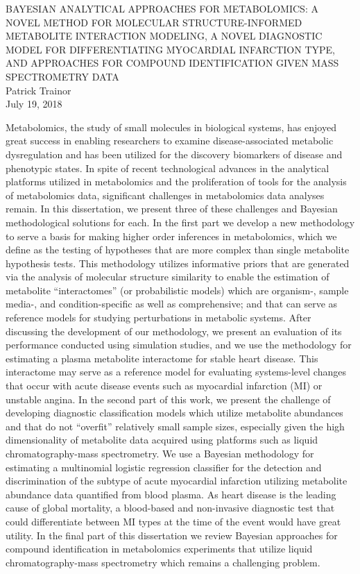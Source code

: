 \documentclass[final]{ulthesis}
\begin{document}
\begin{dissertationabstract}
\begin{center}
	BAYESIAN ANALYTICAL APPROACHES FOR METABOLOMICS: A NOVEL METHOD FOR MOLECULAR STRUCTURE-INFORMED METABOLITE INTERACTION MODELING, A NOVEL DIAGNOSTIC MODEL FOR DIFFERENTIATING MYOCARDIAL INFARCTION TYPE, AND APPROACHES FOR COMPOUND IDENTIFICATION GIVEN MASS SPECTROMETRY DATA \\
	Patrick Trainor \\
	July 19, 2018
\end{center}
Metabolomics, the study of small molecules in biological systems, has enjoyed great success in enabling researchers to examine disease-associated metabolic dysregulation and has been utilized for the discovery biomarkers of disease and phenotypic states. In spite of recent technological advances in the analytical platforms utilized in metabolomics and the proliferation of tools for the analysis of metabolomics data, significant challenges in metabolomics data analyses remain. In this dissertation, we present three of these challenges and Bayesian methodological solutions for each. In the first part we develop a new methodology to serve a basis for making higher order inferences in metabolomics, which we define as the testing of hypotheses that are more complex than single metabolite hypothesis tests. This methodology utilizes informative priors that are generated via the analysis of molecular structure similarity to enable the estimation of metabolite ``interactomes'' (or probabilistic models) which are organism-, sample media-, and condition-specific as well as comprehensive; and that can serve as reference models for studying perturbations in metabolic systems. After discussing the development of our methodology, we present an evaluation of its performance conducted using simulation studies, and we use the methodology for estimating a plasma metabolite interactome for stable heart disease. This interactome may serve as a reference model for evaluating systems-level changes that occur with acute disease events such as myocardial infarction (MI) or unstable angina. In the second part of this work, we present the challenge of developing diagnostic classification models which utilize metabolite abundances and that do not ``overfit'' relatively small sample sizes, especially given the high dimensionality of metabolite data acquired using platforms such as liquid chromatography-mass spectrometry. We use a Bayesian methodology for estimating a multinomial logistic regression classifier for the detection and discrimination of the subtype of acute myocardial infarction utilizing metabolite abundance data quantified from blood plasma. As heart disease is the leading cause of global mortality, a blood-based and non-invasive diagnostic test that could differentiate between MI types at the time of the event would have great utility. In the final part of this dissertation we review Bayesian approaches for compound identification in metabolomics experiments that utilize liquid chromatography-mass spectrometry which remains a challenging problem.
\end{dissertationabstract}
\end{document}
